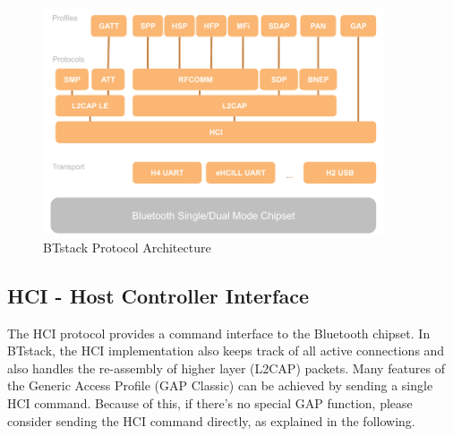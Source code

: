 \begin{figure}[htbp] %
   \centering
   \includegraphics[width=0.9\textwidth]{picts/btstack-protocols.pdf} 
   \caption{BTstack Protocol Architecture}
   \label{fig:BTstackProtocolArchitecture}
\end{figure}


\subsection{HCI - Host Controller Interface}

The HCI protocol provides a command interface to the Bluetooth chipset. In BTstack, the HCI implementation also keeps track of all active connections and also handles the re-assembly of higher layer (L2CAP) packets. Many features of the Generic Access Profile (GAP Classic) can be achieved by sending a single HCI command. Because of this, if there's no special GAP function, please consider sending the HCI command directly, as explained in the following. 

